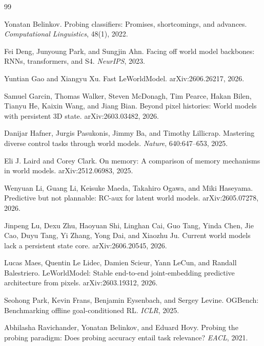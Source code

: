 \begin{thebibliography}{99}\small

Yonatan Belinkov.
\newblock Probing classifiers: Promises, shortcomings, and advances.
\newblock \emph{Computational Linguistics}, 48(1), 2022.

Fei Deng, Junyoung Park, and Sungjin Ahn.
\newblock Facing off world model backbones: RNNs, transformers, and S4.
\newblock \emph{NeurIPS}, 2023.

Yuntian Gao and Xiangyu Xu.
\newblock Fast LeWorldModel.
\newblock arXiv:2606.26217, 2026.

Samuel Garcin, Thomas Walker, Steven McDonagh, Tim Pearce, Hakan Bilen, Tianyu He, Kaixin Wang, and Jiang Bian.
\newblock Beyond pixel histories: World models with persistent 3D state.
\newblock arXiv:2603.03482, 2026.

Danijar Hafner, Jurgis Pasukonis, Jimmy Ba, and Timothy Lillicrap.
\newblock Mastering diverse control tasks through world models.
\newblock \emph{Nature}, 640:647--653, 2025.

Eli J. Laird and Corey Clark.
\newblock On memory: A comparison of memory mechanisms in world models.
\newblock arXiv:2512.06983, 2025.

Wenyuan Li, Guang Li, Keisuke Maeda, Takahiro Ogawa, and Miki Haseyama.
\newblock Predictive but not plannable: RC-aux for latent world models.
\newblock arXiv:2605.07278, 2026.

Jinpeng Lu, Dexu Zhu, Haoyuan Shi, Linghan Cai, Guo Tang, Yinda Chen, Jie Cao, Duyu Tang, Yi Zhang, Yong Dai, and Xiaozhu Ju.
\newblock Current world models lack a persistent state core.
\newblock arXiv:2606.20545, 2026.

Lucas Maes, Quentin Le Lidec, Damien Scieur, Yann LeCun, and Randall Balestriero.
\newblock LeWorldModel: Stable end-to-end joint-embedding predictive architecture from pixels.
\newblock arXiv:2603.19312, 2026.

Seohong Park, Kevin Frans, Benjamin Eysenbach, and Sergey Levine.
\newblock OGBench: Benchmarking offline goal-conditioned RL.
\newblock \emph{ICLR}, 2025.

Abhilasha Ravichander, Yonatan Belinkov, and Eduard Hovy.
\newblock Probing the probing paradigm: Does probing accuracy entail task relevance?
\newblock \emph{EACL}, 2021.


\end{thebibliography}
